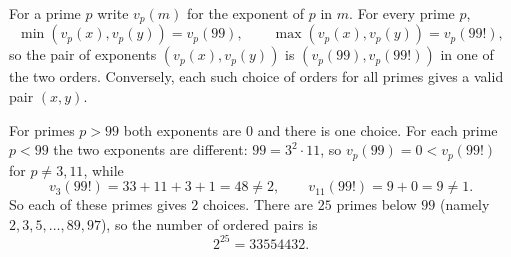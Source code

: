 For a prime $p$ write $v_p(m)$ for the exponent of $p$ in $m$. For every prime $p$,
\[\min\left(v_p(x),v_p(y)\right)=v_p(99),\qquad \max\left(v_p(x),v_p(y)\right)=v_p(99!),\]
so the pair of exponents $\left(v_p(x),v_p(y)\right)$ is $\left(v_p(99),v_p(99!)\right)$ in one of the two orders. Conversely, each such choice of orders for all primes gives a valid pair $(x,y)$.

For primes $p>99$ both exponents are $0$ and there is one choice. For each prime $p<99$ the two exponents are different: $99=3^2\cdot11$, so $v_p(99)=0<v_p(99!)$ for $p\ne3,11$, while
\[v_3(99!)=33+11+3+1=48\ne2,\qquad v_{11}(99!)=9+0=9\ne1 .\]
So each of these primes gives $2$ choices. There are $25$ primes below $99$ (namely $2,3,5,\ldots,89,97$), so the number of ordered pairs is
\[2^{25}=\boxed{33554432}.\]
